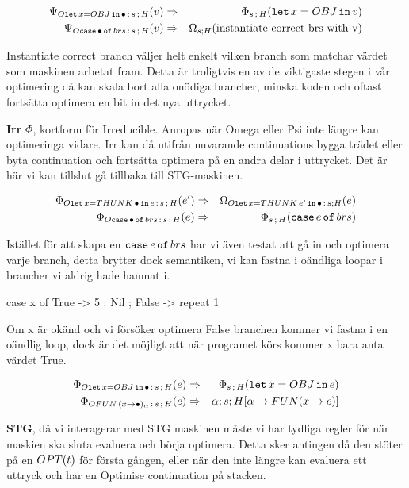 \documentclass[../Optimise]{subfiles}
\begin{document}
\begin{align*}
\Psi_{O\mathtt{let\,}x=OBJ\,\mathtt{in}\,\bullet\,:\,s\,;\,H}(v) & \Rightarrow & \Phi_{s\,;\,H}(\mathtt{let}\,x=OBJ\,\mathtt{in}\,v)\\
\Psi_{O\mathtt{case}\,\bullet\,\mathtt{of}\,brs\,:\,s\,;\,H}(v) & \Rightarrow & \Omega_{s;H}(\text{instantiate correct brs with v})\end{align*}


Instantiate correct branch väljer helt enkelt vilken branch som matchar
värdet som maskinen arbetat fram. Detta är troligtvis en av de viktigaste
stegen i vår optimering då kan skala bort alla onödiga brancher, minska
koden och oftast fortsätta optimera en bit in det nya uttrycket.

\textbf{Irr} $\Phi$, kortform för Irreducible. Anropas när Omega eller Psi inte längre
kan optimeringa vidare. Irr kan då utifrån nuvarande continuations
bygga trädet eller byta continuation och fortsätta optimera på en
andra delar i uttrycket. Det är här vi kan tillslut gå tillbaka till
STG-maskinen.

\begin{align*}
\Phi_{O\mathtt{let\,}x=THUNK\,\bullet\,\mathtt{in}\,e\,:\,s\,;\,H}(e') & \Rightarrow & \Omega_{O\mathtt{let\,}x=THUNK\,e'\,\mathtt{in}\,\bullet\,:\,s;H}(e)\\
\Phi_{O\mathtt{case}\,\bullet\,\mathtt{of}\,brs\,:\,s\,;\,H}(e) & \Rightarrow & \Phi_{s\,;\,H}(\mathtt{case}\,e\,\mathtt{of}\,brs)
\end{align*}


Istället för att skapa en $\mathtt{case}\,e\,\mathtt{of}\,brs$ har vi även testat att gå in
och optimera varje branch, detta brytter dock semantiken, vi kan fastna
i oändliga loopar i brancher vi aldrig hade hamnat i. 

\begin{codeEx}
case x of
    { True  -> 5 : Nil
    ; False -> repeat 1
    }
\end{codeEx}
Om x är okänd och vi försöker optimera False branchen kommer vi fastna
i en oändlig loop, dock är det möjligt att när programet körs kommer
x bara anta värdet True. 

\begin{align*}
\Phi_{O\mathtt{let\,}x=OBJ\,\mathtt{in}\,\bullet\,:\,s\,;\,H}(e) & \Rightarrow & \Phi_{s\,;\,H}(\mathtt{let}\,x=OBJ\,\mathtt{in}\,e)\\
\Phi_{OFUN\,(\bar{x}\to\bullet)_{\alpha}\,:\,s\,;\,H}(e) & \Rightarrow & \alpha;s;H[\alpha\mapsto FUN(\bar{x}\to e)]
\end{align*}




\textbf{STG}, då vi interagerar med STG maskinen måste vi har tydliga regler
för när maskien ska sluta evaluera och börja optimera. Detta sker
antingen då den stöter på en $OPT(t)$ för första gången, eller när den
inte längre kan evaluera ett uttryck och har en Optimise continuation
på stacken.
\end{document}
